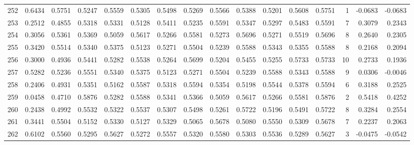 \begin{tabular}{lrrrrrrrrrrrrrrr}
252 &      0.6434 &  0.5751 &  0.5247 &  0.5559 &  0.5305 &  0.5498 &  0.5269 &  0.5566 &  0.5388 &  0.5201 &   0.5608 &     0.5751 &      1 &                   -0.0683 &                    -0.0683 \\
253 &      0.2512 &  0.4855 &  0.5318 &  0.5331 &  0.5128 &  0.5411 &  0.5235 &  0.5591 &  0.5347 &  0.5297 &   0.5483 &     0.5591 &      7 &                    0.3079 &                     0.2343 \\
254 &      0.3056 &  0.5361 &  0.5369 &  0.5059 &  0.5617 &  0.5266 &  0.5581 &  0.5273 &  0.5696 &  0.5271 &   0.5519 &     0.5696 &      8 &                    0.2640 &                     0.2305 \\
255 &      0.3420 &  0.5514 &  0.5340 &  0.5375 &  0.5123 &  0.5271 &  0.5504 &  0.5239 &  0.5588 &  0.5343 &   0.5355 &     0.5588 &      8 &                    0.2168 &                     0.2094 \\
256 &      0.3000 &  0.4936 &  0.5441 &  0.5282 &  0.5538 &  0.5264 &  0.5699 &  0.5204 &  0.5455 &  0.5255 &   0.5733 &     0.5733 &     10 &                    0.2733 &                     0.1936 \\
257 &      0.5282 &  0.5236 &  0.5551 &  0.5340 &  0.5375 &  0.5123 &  0.5271 &  0.5504 &  0.5239 &  0.5588 &   0.5343 &     0.5588 &      9 &                    0.0306 &                    -0.0046 \\
258 &      0.2406 &  0.4931 &  0.5351 &  0.5162 &  0.5587 &  0.5318 &  0.5594 &  0.5354 &  0.5198 &  0.5544 &   0.5378 &     0.5594 &      6 &                    0.3188 &                     0.2525 \\
259 &      0.0458 &  0.4710 &  0.5876 &  0.5282 &  0.5588 &  0.5341 &  0.5366 &  0.5059 &  0.5617 &  0.5266 &   0.5581 &     0.5876 &      2 &                    0.5418 &                     0.4252 \\
260 &      0.2438 &  0.4992 &  0.5532 &  0.5322 &  0.5537 &  0.5307 &  0.5498 &  0.5261 &  0.5722 &  0.5196 &   0.5491 &     0.5722 &      8 &                    0.3284 &                     0.2554 \\
261 &      0.3441 &  0.5504 &  0.5152 &  0.5330 &  0.5127 &  0.5329 &  0.5065 &  0.5678 &  0.5080 &  0.5550 &   0.5309 &     0.5678 &      7 &                    0.2237 &                     0.2063 \\
262 &      0.6102 &  0.5560 &  0.5295 &  0.5627 &  0.5272 &  0.5557 &  0.5320 &  0.5580 &  0.5303 &  0.5536 &   0.5289 &     0.5627 &      3 &                   -0.0475 &                    -0.0542 \\

\end{tabular}
